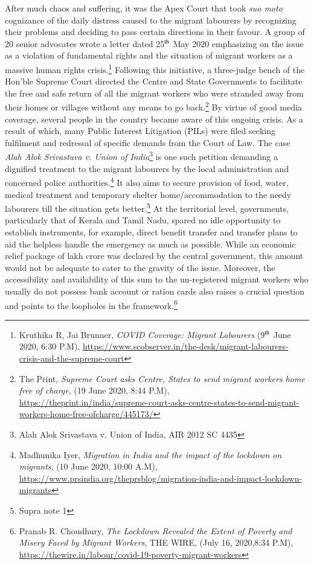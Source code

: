 \begin{multicols}{2}
\noi
After much chaos and suffering, it was the Apex Court that took \textit{suo moto} cognizance of the
daily distress caused to the migrant labourers by recognizing their problems and deciding to
pass certain directions in their favour. A group of 20 senior advocates wrote a letter dated 25$^{\rm th}$
May 2020 emphasizing on the issue as a violation of fundamental rights and the situation of
migrant workers as a massive human rights crisis.\footnote{Kruthika R, Jai Brunner, \textit{COVID Coverage: Migrant Labourers} (9$^{\rm th}$ June 2020, 6:30 P.M),
\url{https://www.scobserver.in/the-desk/migrant-labourers-crisis-and-the-supreme-court}} Following this initiative, a three-judge bench of the Hon’ble Supreme Court directed the Centre and State Governments to facilitate
the free and safe return of all the migrant workers who were stranded away from their homes
or villages without any means to go back.\footnote{The Print, \textit{Supreme Court asks Centre, States to send migrant workers home free of charge}, (19 June 2020, 8:44 P.M),\\ \url{https://theprint.in/india/supreme-court-asks-centre-states-to-send-migrant-workers-home-free-ofcharge/445173/}} By virtue of good media coverage, several
people in the country became aware of this ongoing crisis. As a result of which, many Public
Interest Litigation (PILs) were filed seeking fulfilment and redressal of specific demands
from the Court of Law. The case \textit{Alah Alok Srivastava v. Union of India}\footnote{Alah Alok Srivastava v. Union of India, AIR 2012 SC 4435 } is one such petition
demanding a dignified treatment to the migrant labourers by the local administration and
concerned police authorities.\footnote{Madhunika Iyer, \textit{Migration in India and the impact of the lockdown on migrants}, (10 June 2020, 10:00 A.M),
\url{https://www.prsindia.org/theprsblog/migration-india-and-impact-lockdown-migrants}} It also aims to secure provision of food, water, medical
treatment and temporary shelter home/accommodation to the needy labourers till the situation
gets better.\footnote{Supra note 1} At the territorial level, governments, particularly that of Kerala and Tamil
Nadu, spared no idle opportunity to establish instruments, for example, direct benefit transfer
and transfer plans to aid the helpless handle the emergency as much as possible. While an
economic relief package of  lakh crore was declared by the central government, this
amount would not be adequate to cater to the gravity of the issue. Moreover, the accessibility
and availability of this sum to the un-registered migrant workers who usually do not possess
bank account or ration cards also raises a crucial question and points to the loopholes in the
framework.\footnote{Pranab R. Choudhury, \textit{The Lockdown Revealed the Extent of Poverty and Misery Faced by Migrant Workers},
THE WIRE, (July 16, 2020,8:34 P.M), \url{https://thewire.in/labour/covid-19-poverty-migrant-workers}}


\end{multicols}
